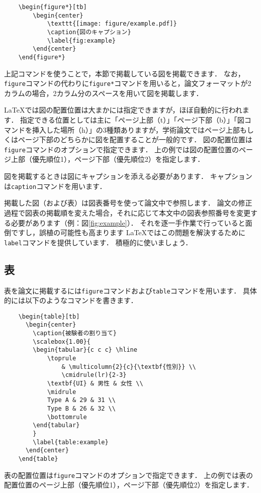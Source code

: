 \begin{verbatim}
    \begin{figure*}[tb]
        \begin{center}
            \texttt{[image: figure/example.pdf]}
            \caption{図のキャプション}
            \label{fig:example}
        \end{center}
    \end{figure*}
\end{verbatim}
上記コマンドを使うことで，本節で掲載している図を掲載できます．
なお，{\tt figure}コマンドの代わりに{\tt figure*}コマンドを用いると，論文フォーマットが2カラムの場合，2カラム分のスペースを用いて図を掲載します．

LaTeXでは図の配置位置は大まかには指定できますが，ほぼ自動的に行われます．
指定できる位置としては主に「ページ上部（t）」「ページ下部（b）」「図コマンドを挿入した場所（h）」の3種類ありますが，学術論文ではページ上部もしくはページ下部のどちらかに図を配置することが一般的です．
図の配置位置は{\tt figure}コマンドのオプションで指定できます．
上の例では図の配置位置のページ上部（優先順位1），ページ下部（優先順位2）を指定します．

図を掲載するときは図にキャプションを添える必要があります．
キャプションは{\tt caption}コマンドを用います．

掲載した図（および表）は図表番号を使って論文中で参照します．
論文の修正過程で図表の掲載順を変えた場合，それに応じて本文中の図表参照番号を変更する必要があります（例：図\ref{fig:example}）．
それを逐一手作業で行っていると面倒ですし，誤植の可能性も高まります
LaTeXではこの問題を解決するために{\tt label}コマンドを提供しています．
積極的に使いましょう．


\subsection{表}
表を論文に掲載するには{\tt figure}コマンドおよび{\tt table}コマンドを用います．
具体的には以下のようなコマンドを書きます．

\begin{verbatim}
    \begin{table}[tb]
      \begin{center}
        \caption{被験者の割り当て}
        \scalebox{1.00}{
        \begin{tabular}{c c c} \hline
            \toprule
                & \multicolumn{2}{c}{\textbf{性別}} \\
                \cmidrule(lr){2-3}
            \textbf{UI} & 男性 & 女性 \\
            \midrule
            Type A & 29 & 31 \\
            Type B & 26 & 32 \\
            \bottomrule
        \end{tabular}
        }
        \label{table:example}
      \end{center}
    \end{table}
\end{verbatim}
表の配置位置は{\tt figure}コマンドのオプションで指定できます．
上の例では表の配置位置のページ上部（優先順位1），ページ下部（優先順位2）を指定します．

